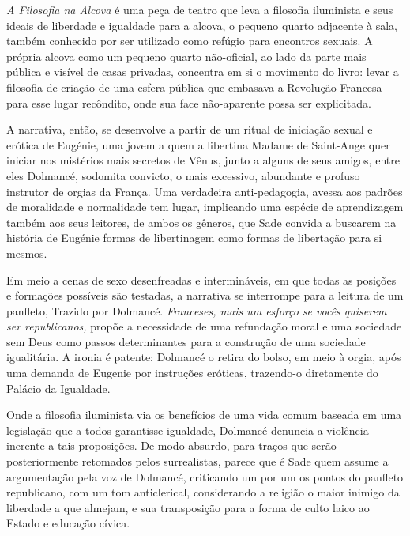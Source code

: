 \emph{A Filosofia na Alcova} é uma peça de teatro que leva a filosofia
iluminista e seus ideais de liberdade e igualdade para a alcova, o
pequeno quarto adjacente à sala, também conhecido por ser utilizado como
refúgio para encontros sexuais. A própria alcova como um pequeno quarto
não-oficial, ao lado da parte mais pública e visível de casas privadas,
concentra em si o movimento do livro: levar a filosofia de criação de
uma esfera pública que embasava a Revolução Francesa para esse lugar
recôndito, onde sua face não-aparente possa ser explicitada.

A narrativa, então, se desenvolve a partir de um ritual de iniciação
sexual e erótica de Eugénie, uma jovem a quem a libertina Madame de
Saint-Ange quer iniciar nos mistérios mais secretos de Vênus, junto a
alguns de seus amigos, entre eles Dolmancé, sodomita convicto, o mais
excessivo, abundante e profuso instrutor de orgias da França. Uma
verdadeira anti-pedagogia, avessa aos padrões de moralidade e
normalidade tem lugar, implicando uma espécie de aprendizagem também aos
seus leitores, de ambos os gêneros, que Sade convida a buscarem na
história de Eugénie formas de libertinagem como formas de libertação
para si mesmos.

Em meio a cenas de sexo desenfreadas e intermináveis, em que todas as
posições e formações possíveis são testadas, a narrativa se interrompe
para a leitura de um panfleto, Trazido por Dolmancé. \emph{Franceses,
mais um esforço se vocês quiserem ser republicanos,} propõe a
necessidade de uma refundação moral e uma sociedade sem Deus como passos
determinantes para a construção de uma sociedade igualitária. A ironia é
patente: Dolmancé o retira do bolso, em meio à orgia, após uma demanda
de Eugenie por instruções eróticas, trazendo-o diretamente do Palácio da
Igualdade.

Onde a filosofia iluminista via os benefícios de uma vida comum baseada
em uma legislação que a todos garantisse igualdade, Dolmancé denuncia a
violência inerente a tais proposições. De modo absurdo, para traços que
serão posteriormente retomados pelos surrealistas, parece que é Sade
quem assume a argumentação pela voz de Dolmancé, criticando um por um os
pontos do panfleto republicano, com um tom anticlerical, considerando a
religião o maior inimigo da liberdade a que almejam, e sua transposição
para a forma de culto laico ao Estado e educação cívica.

